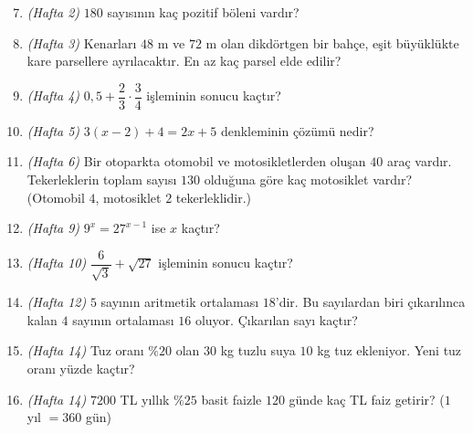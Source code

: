 \begin{enumerate}[label=\textbf{\arabic*.},leftmargin=*,itemsep=6pt]\setcounter{enumi}{6}
\item \textit{(Hafta 2)} \(180\) sayısının kaç pozitif böleni vardır?
\item \textit{(Hafta 3)} Kenarları \(48\) m ve \(72\) m olan dikdörtgen bir bahçe, eşit büyüklükte kare parsellere ayrılacaktır. En az kaç parsel elde edilir?
\item \textit{(Hafta 4)} \(0{,}5+\dfrac{2}{3}\cdot\dfrac{3}{4}\) işleminin sonucu kaçtır?
\item \textit{(Hafta 5)} \(3(x-2)+4=2x+5\) denkleminin çözümü nedir?
\item \textit{(Hafta 6)} Bir otoparkta otomobil ve motosikletlerden oluşan \(40\) araç vardır. Tekerleklerin toplam sayısı \(130\) olduğuna göre kaç motosiklet vardır? (Otomobil \(4\), motosiklet \(2\) tekerleklidir.)
\item \textit{(Hafta 9)} \(9^{x}=27^{x-1}\) ise \(x\) kaçtır?
\item \textit{(Hafta 10)} \(\dfrac{6}{\sqrt{3}}+\sqrt{27}\) işleminin sonucu kaçtır?
\item \textit{(Hafta 12)} \(5\) sayının aritmetik ortalaması \(18\)'dir. Bu sayılardan biri çıkarılınca kalan \(4\) sayının ortalaması \(16\) oluyor. Çıkarılan sayı kaçtır?
\item \textit{(Hafta 14)} Tuz oranı \(\%20\) olan \(30\) kg tuzlu suya \(10\) kg tuz ekleniyor. Yeni tuz oranı yüzde kaçtır?
\item \textit{(Hafta 14)} \(7200\) TL yıllık \(\%25\) basit faizle \(120\) günde kaç TL faiz getirir? (\(1\) yıl \(=360\) gün)
\end{enumerate}

